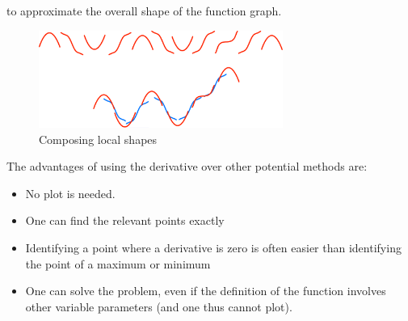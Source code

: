 to approximate the overall shape of the function graph.
\begin{figure}
\begin{center}
\includegraphics[width=8cm]{pic/FuncSynth.pdf}
\end{center}
\caption{Composing local shapes}
\label{figfuncsynth}
\end{figure}

\bigskip


The advantages of using the derivative over other potential methods are:
\begin{itemize}
\item No plot is needed.
\item One can find the relevant points exactly
\item Identifying a point where a derivative is zero is often easier than
identifying the point of a maximum or minimum
\item One can solve the problem, even if the definition of the function
involves other variable parameters (and one thus cannot plot).
\end{itemize}

